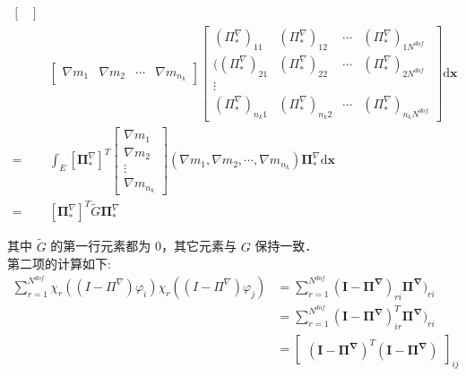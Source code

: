 \begin{equation}
\begin{aligned}
\begin{bmatrix}
\end{bmatrix}  \\
&\begin{bmatrix} 
\nabla m_{1} & \nabla m_{2} & \cdots &\nabla m_{n_k}
\end{bmatrix}
\begin{bmatrix} 
(\Pi_{*}^{\nabla})_{1 1} & (\Pi_{*}^{\nabla})_{1 2} & \cdots  & (\Pi_{*}^{\nabla})_{1 N^{dof}} \\ 
((\Pi_{*}^{\nabla})_{2 1} & (\Pi_{*}^{\nabla})_{2 2} & \cdots  & (\Pi_{*}^{\nabla})_{2 N^{dof}} \\ 
\vdots\\
(\Pi_{*}^{\nabla})_{n_k 1} & (\Pi_{*}^{\nabla})_{n_k 2} & \cdots  & (\Pi_{*}^{\nabla})_{n_k N^{dof}}
\end{bmatrix} \mathrm d \mathbf x\\
= & \int_E [\boldsymbol \Pi_{*}^\nabla]^T \begin{bmatrix}
\nabla m_1 \\ \nabla m_2 \\\vdots\\ \nabla m_{n_k}
\end{bmatrix}
(\nabla m_1, \nabla m_2, \cdots,  \nabla m_{n_k}) \boldsymbol \Pi_{*}^{\nabla} \mathrm d \mathbf x \\
= & [\boldsymbol \Pi_{*}^\nabla]^T \tilde{G} \boldsymbol \Pi_{*}^\nabla
\end{aligned}
\end{equation}

其中 $\tilde{G}$ 的第一行元素都为 0，其它元素与 $G$ 保持一致．\\

第二项的计算如下: \\
\begin{equation}
\begin{aligned}
\sum_{r = 1}^{N^{dof}} \chi_r((I-\Pi^{\nabla})\varphi_i) \chi_r((I-\Pi^{\nabla})\varphi_j) & = \sum_{r = 1}^{N^{dof}} (\mathbf{I} - \boldsymbol {\Pi^{\nabla}})_{ri}\boldsymbol {\Pi^{\nabla}})_{ri} \\
& = \sum_{r = 1}^{N^{dof}} (\mathbf{I} - \boldsymbol {\Pi^{\nabla}})_{ir}^T\boldsymbol {\Pi^{\nabla}})_{ri} \\
& = \begin{bmatrix}(\mathbf{I} - \boldsymbol {\Pi^{\nabla}})^T(\mathbf{I} - \boldsymbol {\Pi^{\nabla}})\end{bmatrix}_{ij}
\end{aligned}
\end{equation}

